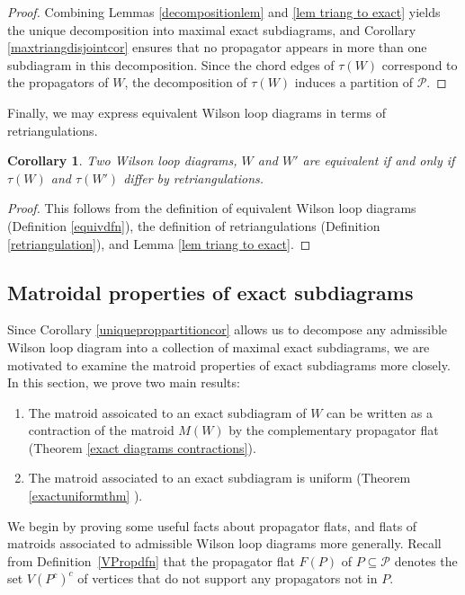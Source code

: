 \documentclass[11pt]{article}
\newcommand{\cP}{\mathcal{P}}
\newtheorem{cor}[thm]{Corollary}
\theoremstyle{remark}
\theoremstyle{definition}
\begin{document}
\begin{proof}
Combining Lemmas \ref{decompositionlem} and \ref{lem triang to exact} yields the unique decomposition into maximal exact subdiagrams, and Corollary \ref{maxtriangdisjointcor} ensures that no propagator appears in more than one subdiagram in this decomposition. Since the chord edges of $\tau(W)$ correspond to the propagators of $W$, the decomposition of $\tau(W)$ induces a partition of $\cP$.
\end{proof}

Finally, we may express equivalent Wilson loop diagrams in terms of retriangulations.

\begin{cor}\label{equialentretriangulation}
Two Wilson loop diagrams, $W$ and $W'$ are equivalent if and only if $\tau(W)$ and $\tau(W')$ differ by retriangulations.
\end{cor}

\begin{proof}
This follows from the definition of equivalent Wilson loop diagrams (Definition \ref{equivdfn}), the definition of retriangulations (Definition \ref{retriangulation}), and Lemma \ref{lem triang to exact}.
\end{proof}



\subsection{Matroidal properties of exact subdiagrams \label{sec: exact diagram matroidal props}}

Since Corollary \ref{uniqueproppartitioncor} allows us to decompose any admissible Wilson loop diagram into a collection of maximal exact subdiagrams, we are motivated to examine the matroid properties of exact subdiagrams more closely. In this section, we prove two main results:
\begin{enumerate}
\item The matroid assoicated to an exact subdiagram of $W$ can be written as a contraction of the matroid $M(W)$ by the complementary propagator flat (Theorem \ref{exact diagrams contractions}). 
\item The matroid associated to an exact subdiagram is uniform (Theorem \ref{exactuniformthm} ).
\end{enumerate}

We begin by proving some useful facts about propagator flats, and flats of matroids associated to admissible Wilson loop diagrams more generally. Recall from Definition~\ref{VPropdfn} that the propagator flat $F(P)$ of $P \subseteq \cP$ denotes the set $V(P^c)^c$ of vertices that do not support any propagators not in $P$.
\end{document}
